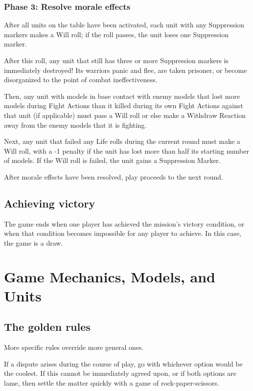 \begin{multicols}{2}
\subsection*{Phase 3: Resolve morale effects}

After all units on the table have been activated, each unit with any Suppression markers makes a Will roll; if the roll passes, the unit loses one Suppression marker.

After this roll, any unit that still has three or more Suppression markers is immediately destroyed! Its warriors panic and flee, are taken prisoner, or become disorganized to the point of combat ineffectiveness.

Then, any unit with models in base contact with enemy models that lost more models during Fight Actions than it killed during its own Fight Actions against that unit (if applicable) must pass a Will roll or else make a Withdraw Reaction away from the enemy models that it is fighting.

Next, any unit that failed any Life rolls during the current round must make a Will roll, with a -1 penalty if the unit has lost more than half its starting number of models. If the Will roll is failed, the unit gains a Suppression Marker.

After morale effects have been resolved, play proceeds to the next round.

\section*{Achieving victory}

The game ends when one player has achieved the mission's victory condition, or when that condition becomes impossible for any player to achieve. In this case, the game is a draw.




\chapter{Game Mechanics, Models, and Units}

\section*{The golden rules}

More specific rules override more general ones.

If a dispute arises during the course of play, go with whichever option would be the coolest. If this cannot be immediately agreed upon, or if both options are lame, then settle the matter quickly with a game of rock-paper-scissors.





\end{multicols}
